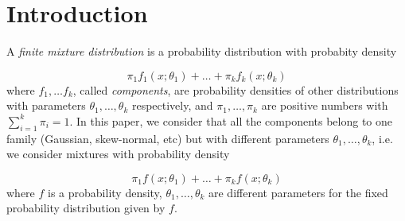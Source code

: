 \documentclass[10pt, a4paper]{article}
\begin{document}

\section{Introduction}

\noindent  A \emph{finite mixture distribution} is a probability distribution with probabity density

\[
\pi_1 f_1(x ; \theta_1) + \dots + \pi_k f_k(x ; \theta_k)
\]
where $f_1, \dots f_k$, called \emph{components}, are probability densities of other distributions with parameters $\theta_1, \dots, \theta_k$ respectively, and $\pi_1, \dots, \pi_k$ are positive numbers with $\sum_{i=1}^k \pi_i = 1$. In this paper, we consider that all the components belong to one family (Gaussian, skew-normal, etc) but with different parameters $\theta_1, \dots, \theta_k$, i.e. we consider mixtures with probability density

\begin{equation}\label{mixt}
\pi_1 f(x ; \theta_1) + \dots + \pi_k f(x ; \theta_k)
\end{equation}
where $f$ is a probability density, $\theta_1, \dots, \theta_k$ are different parameters for the fixed probability distribution given by $f$.
\end{document}
